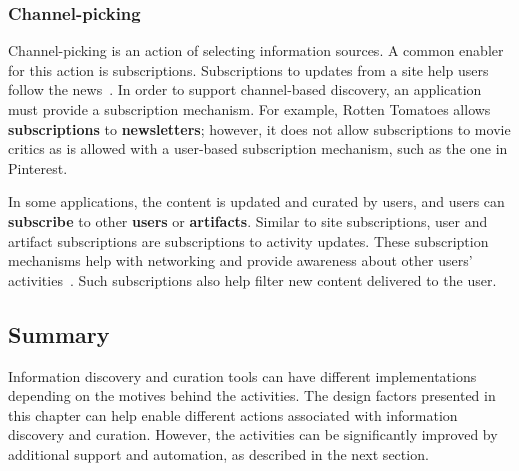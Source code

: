 {{{\subsubsection{Channel-picking}

Channel-picking is an action of selecting information sources. A common enabler for this action is subscriptions. Subscriptions to updates from a site help users follow the news~\cite{java2007feeds}. In order to support channel-based discovery, an application must provide a subscription mechanism. For example, Rotten Tomatoes allows \textbf{subscriptions} to \textbf{newsletters}; however, it does not allow subscriptions to movie critics as is allowed with a user-based subscription mechanism, such as the one in Pinterest. 

In some applications, the content is updated and curated by users, and users can \textbf{subscribe} to other \textbf{users} or \textbf{artifacts}. Similar to site subscriptions, user and artifact subscriptions are subscriptions to activity updates. These subscription mechanisms help with networking and provide awareness about other users' activities~\cite{millen2005social}. Such subscriptions also help filter new content delivered to the user. 
} %
} %

{\subsection{Summary}
Information discovery and curation tools can have different implementations depending on the motives behind the activities. The design factors presented in this chapter can help enable different actions associated with information discovery and curation. However, the activities can be significantly improved by additional support and automation, as described in the next section.
}
} %
\clearpage
